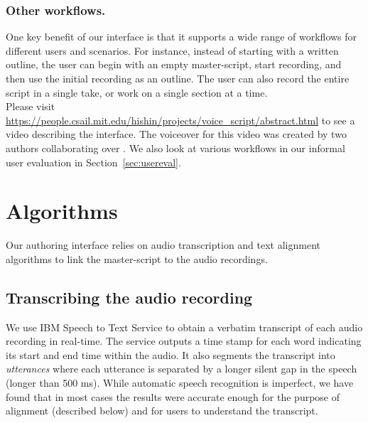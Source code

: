 \subsubsection{Other workflows.} 
One key benefit of our interface is that it supports a wide range of workflows for different users and scenarios. For instance, instead of starting with a written outline, the user can begin with an empty master-script, start recording, and then use  the initial recording as an outline. The user can also record the entire script in a single take, or work on a single section at a time. \\

Please visit \url{https://people.csail.mit.edu/hishin/projects/voice_script/abstract.html} to see a video describing the interface. The voiceover for this video was created by two authors collaborating over \voicescript . We also look at various workflows in our informal user evaluation in Section~\ref{sec:usereval}. 

\section{Algorithms}
\label{sec:algorithms}
Our authoring interface relies on audio transcription and text alignment algorithms to link the master-script to the audio recordings.  

\subsection{Transcribing the audio recording}
We use IBM Speech to Text Service \cite{ibmspeechtotext} to obtain a verbatim transcript of each audio recording in real-time. The service outputs a time stamp for each word indicating its start and end time within the audio. It also segments the transcript into \textit{utterances} where each utterance is separated by a longer silent gap in the speech (longer than 500 ms). While automatic speech recognition is imperfect, we have found that in most cases the results were accurate enough for the purpose of alignment (described below) and for users to understand the transcript. 
  
